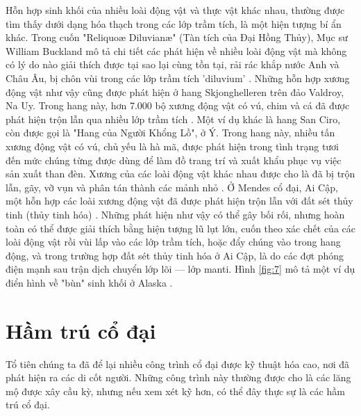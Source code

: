 \documentclass[10pt,twocolumn,letterpaper]{article}
\begin{document}
Hỗn hợp sinh khối của nhiều loài động vật và thực vật khác nhau, thường được tìm thấy dưới dạng hóa thạch trong các lớp trầm tích, là một hiện tượng bí ẩn khác. Trong cuốn "Reliquoæ Diluvianæ" (Tàn tích của Đại Hồng Thủy), Mục sư William Buckland mô tả chi tiết các phát hiện về nhiều loài động vật mà không có lý do nào giải thích được tại sao lại cùng tồn tại, rải rác khắp nước Anh và Châu Âu, bị chôn vùi trong các lớp trầm tích 'diluvium' \cite{58}. Những hỗn hợp xương động vật như vậy cũng được phát hiện ở hang Skjonghelleren trên đảo Valdroy, Na Uy. Trong hang này, hơn 7.000 bộ xương động vật có vú, chim và cá đã được phát hiện trộn lẫn qua nhiều lớp trầm tích \cite{59}. Một ví dụ khác là hang San Ciro, còn được gọi là "Hang của Người Khổng Lồ", ở Ý. Trong hang này, nhiều tấn xương động vật có vú, chủ yếu là hà mã, được phát hiện trong tình trạng tươi đến mức chúng từng được dùng để làm đồ trang trí và xuất khẩu phục vụ việc sản xuất than đèn. Xương của các loài động vật khác nhau được cho là đã bị trộn lẫn, gãy, vỡ vụn và phân tán thành các mảnh nhỏ \cite{60,61}. Ở Mendes cổ đại, Ai Cập, một hỗn hợp các loài xương động vật đã được phát hiện trộn lẫn với đất sét thủy tinh (thủy tinh hóa) \cite{57}. Những phát hiện như vậy có thể gây bối rối, nhưng hoàn toàn có thể được giải thích bằng hiện tượng lũ lụt lớn, cuốn theo xác chết của các loài động vật rồi vùi lấp vào các lớp trầm tích, hoặc đẩy chúng vào trong hang động, và trong trường hợp đất sét thủy tinh hóa ở Ai Cập, là do các đợt phóng điện mạnh sau trận dịch chuyển lớp lõi — lớp manti. Hình \ref{fig:7} mô tả một ví dụ điển hình về "bùn" sinh khối ở Alaska \cite{56}.

\section{Hầm trú cổ đại}

Tổ tiên chúng ta đã để lại nhiều công trình cổ đại được kỹ thuật hóa cao, nơi đã phát hiện ra các di cốt người. Những công trình này thường được cho là các lăng mộ được xây cầu kỳ, nhưng nếu xem xét kỹ hơn, có thể đây thực sự là các hầm trú cổ đại.
\end{document}
